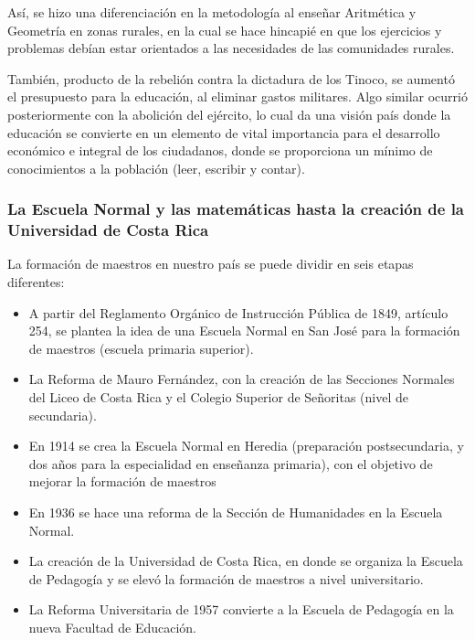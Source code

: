 Así, se hizo una diferenciación en la metodología al enseñar Aritmética y Geometría en zonas rurales, en la cual se hace hincapié en que los ejercicios y problemas debían estar orientados a las necesidades de las comunidades rurales. 

También, producto de la rebelión contra la dictadura de los Tinoco, se aumentó el presupuesto para la educación, al eliminar gastos militares. Algo similar ocurrió posteriormente con la abolición del ejército, lo cual da una visión país donde la educación se convierte en un elemento de vital importancia para el desarrollo económico e integral de los ciudadanos, donde se proporciona un mínimo de conocimientos a la población (leer, escribir y contar).

\subsubsection*{La Escuela Normal y las matemáticas hasta la creación de la Universidad de Costa Rica}

La formación de maestros en nuestro país se puede dividir en seis etapas diferentes:

\begin{itemize}

  \color{blue}  \item \color{black} A partir del Reglamento Orgánico de Instrucción Pública de 1849, artículo 254, se plantea la idea de una Escuela Normal en San José para la formación de maestros (escuela primaria superior).
    
   \color{blue} \item \color{black} La Reforma de Mauro Fernández, con la creación de las Secciones Normales del Liceo de Costa Rica y el Colegio Superior de Señoritas (nivel de secundaria).
    
    \color{blue} \item \color{black} En 1914 se crea la Escuela Normal en Heredia (preparación postsecundaria, y dos años para la especialidad en enseñanza primaria), con el objetivo de mejorar la formación de maestros
    
    \color{blue} \item \color{black} En 1936 se hace una reforma de la Sección de Humanidades en la Escuela Normal.
    
    \color{blue} \item \color{black} La creación de la Universidad de Costa Rica, en donde se organiza la Escuela de Pedagogía y se elevó la formación de maestros a nivel universitario. 
    
    \color{blue} \item \color{black} La Reforma Universitaria de 1957 convierte a la Escuela de Pedagogía en la nueva Facultad de Educación. 
\end{itemize}


